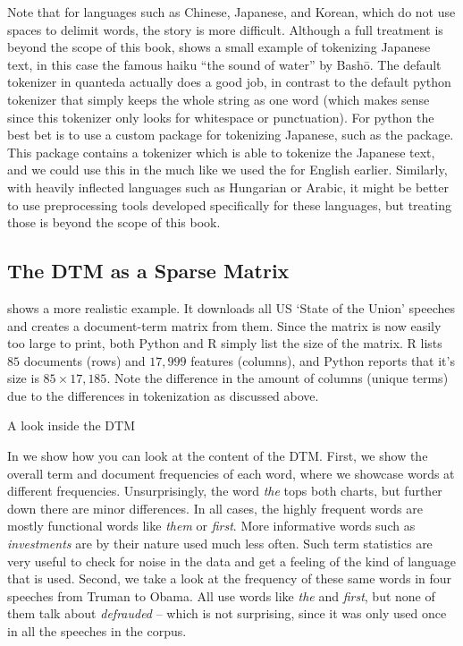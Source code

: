 Note that for languages such as Chinese, Japanese, and Korean, which do not use spaces to delimit words, the story is more difficult.
Although a full treatment is beyond the scope of this book,  shows a small example of tokenizing Japanese text,
in this case the famous haiku ``the sound of water'' by Bash\={o}.
The default tokenizer in quanteda actually does a good job, in contrast to the default python tokenizer
that simply keeps the whole string as one word
(which makes sense since this tokenizer only looks for whitespace or punctuation).
For python the best bet is to use a custom package for tokenizing Japanese, such as the  package.
This package contains a tokenizer which is able to tokenize the Japanese text, and we could use this in the 
much like we used the  for English earlier.
Similarly, with heavily inflected languages such as Hungarian or Arabic,
it might be better to use preprocessing tools developed specifically for these languages, but treating those is 
beyond the scope of this book. 


\subsection{The DTM as a Sparse Matrix}


 shows a more realistic example.
It downloads all US `State of the Union' speeches and creates a document-term matrix from them.
Since the matrix is now easily too large to print, both Python and R simply list the size of the matrix.
R lists $85$ documents (rows) and $17,999$ features (columns), and Python reports that it's size is $85\times17,185$.
Note the difference in the amount of columns (unique terms) due to the differences in tokenization as discussed above. 

\begin{ccsexample}
  \caption{A look inside the DTM}\label{ex:freq}
\end{ccsexample}


In  we show how you can look at the content of the DTM. First, we show the overall term and document frequencies of each word, where we showcase words at different frequencies. Unsurprisingly, the word \emph{the} tops both charts, but further down there are minor differences.
In all cases, the highly frequent words are mostly functional words like \emph{them} or \emph{first}. More informative words such as \emph{investments} are by their nature used much less often.
Such term statistics are very useful to check for noise in the data and get a feeling of the kind of language that is used. 
Second, we take a look at the frequency of these same words in four speeches from Truman to Obama. All use words like \emph{the} and \emph{first}, but none of them talk about \emph{defrauded} -- which is not surprising, since it was only used once in all the speeches in the corpus.

